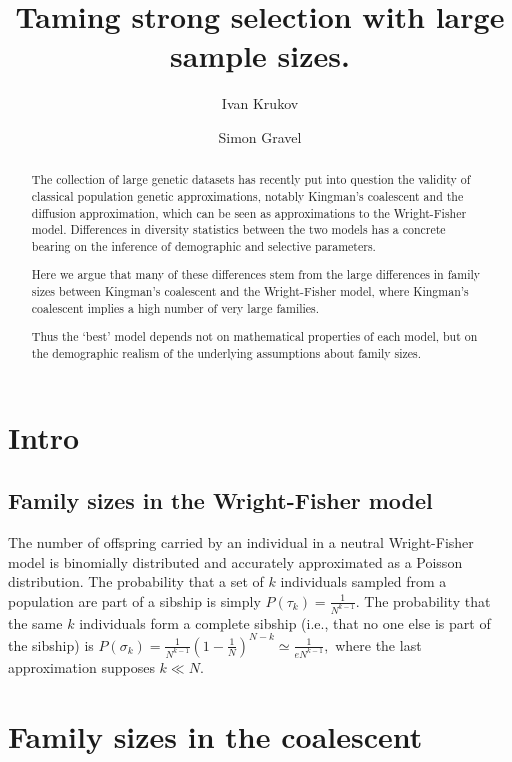 \documentclass[review,nonatbib]{elsarticle}
\begin{document}
\begin{frontmatter}
  \title{ Taming strong selection with large sample sizes. }

  \author{Ivan Krukov}
  \author{Simon Gravel}

  \begin{abstract}
  The collection of large genetic datasets has recently put into question the validity of classical population genetic approximations, 
  notably Kingman's coalescent and the diffusion approximation, which can be seen as approximations to the Wright-Fisher model.
   Differences in diversity statistics between the two models has a concrete bearing on the inference of demographic
    and selective parameters. 

Here we argue that many of these differences stem from the large differences in family sizes between Kingman's coalescent and the 
Wright-Fisher model, where Kingman's coalescent implies a high number of very large families. 
 
 Thus the `best' model depends not on mathematical properties of each model, but on the demographic realism of the underlying 
 assumptions about family sizes.      
  
  
  \end{abstract}

\end{frontmatter}


\section{Intro}

\subsection{Family sizes in the Wright-Fisher model}
The number of offspring carried by an individual in a neutral Wright-Fisher model is binomially distributed and accurately approximated as a Poisson distribution.
The probability that a set of $k$ individuals sampled from a population are part of a sibship is simply $P(\tau_k)=\frac{1}{N^{k-1}}.$ The probability that the same 
$k$ individuals form a complete sibship (i.e., that no one else is part of the sibship) is $P(\sigma_k) = \frac{1}{N^{k-1}} \left(1-\frac{1}{N}\right)^{N-k} \simeq \frac{1}{e N^{k-1}},$ where
the last approximation supposes $k\ll N$.


\section{Family sizes in the coalescent}
\end{document}
